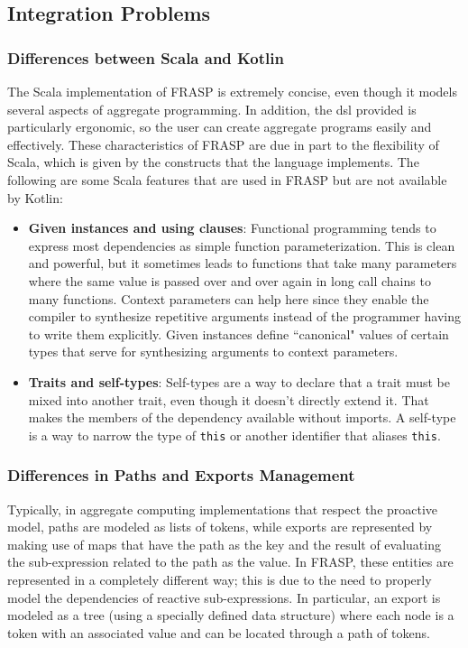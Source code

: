 \subsection{Integration Problems}
\label{subsection:integration-problems}

\subsubsection{Differences between Scala and Kotlin}
The Scala implementation of FRASP is extremely concise, even though it models several aspects of aggregate programming. In addition, the \ac{dsl} provided is particularly ergonomic, so the user can create aggregate programs easily and effectively. These characteristics of FRASP are due in part to the flexibility of Scala, which is given by the constructs that the language implements. The following are some Scala features that are used in FRASP but are not available by Kotlin:

\begin{itemize}
    \item \textbf{Given instances and using clauses}: Functional programming tends to express most dependencies as simple function parameterization. This is clean and powerful, but it sometimes leads to functions that take many parameters where the same value is passed over and over again in long call chains to many functions. Context parameters can help here since they enable the compiler to synthesize repetitive arguments instead of the programmer having to write them explicitly. Given instances define ``canonical" values of certain types that serve for synthesizing arguments to context parameters.
    \item \textbf{Traits and self-types}: Self-types are a way to declare that a trait must be mixed into another trait, even though it doesn't directly extend it. That makes the members of the dependency available without imports. A self-type is a way to narrow the type of \texttt{this} or another identifier that aliases \texttt{this}.
\end{itemize}

\subsubsection{Differences in Paths and Exports Management}

Typically, in aggregate computing implementations that respect the proactive model, paths are modeled as lists of tokens, while exports are represented by making use of maps that have the path as the key and the result of evaluating the sub-expression related to the path as the value.
In FRASP, these entities are represented in a completely different way; this is due to the need to properly model the dependencies of reactive sub-expressions. In particular, an export is modeled as a tree (using a specially defined data structure) where each node is a token with an associated value and can be located through a path of tokens.

